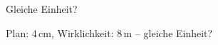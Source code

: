 \setcounter{aufgabe}{11}

\begin{aufgabe}{Gleiche Einheit?}
\begin{teile}
\teil Plan: $4\,\text{cm}$, Wirklichkeit: $8\,\text{m}$ – gleiche Einheit?  \\ 
\end{teile}
\end{aufgabe}

